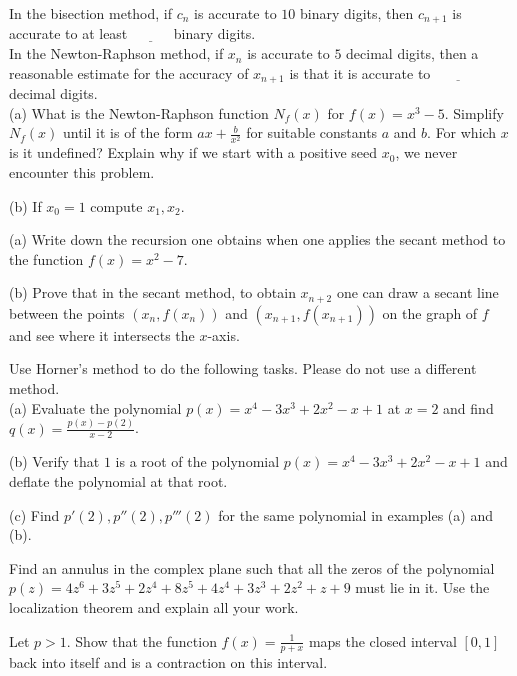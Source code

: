 \documentclass[12pt]{article}
\begin{document}
\newpage
{}
In the bisection method, if $c_n$ is accurate to $10$ binary digits, then $c_{n+1}$ is accurate to at least $\underline{~~~~~~~~~~~~}$ binary digits. \\
In the Newton-Raphson method, if $x_n$ is accurate to $5$ decimal digits, then a reasonable estimate for the accuracy of $x_{n+1}$ is that it is 
accurate to $\underline{~~~~~~~~~~~~~~~}$ decimal digits. \\ 

(a) What is the Newton-Raphson function $N_f(x)$ for $f(x)=x^3-5$. Simplify $N_f(x)$ until it is of the form 
$ax+\frac{b}{x^2}$ for suitable constants $a$ and $b$. For which $x$ is it undefined? Explain why if we start with a positive seed $x_0$, we never 
encounter this problem.

\vspace{2 in}

\noindent
(b) If $x_0=1$ compute $x_1, x_2$.

\newpage
{}
(a) Write down the recursion one obtains when one applies the secant method to the function $f(x)=x^2-7$. 

\vspace{2 in}

\noindent
(b) Prove that in the secant method, to obtain $x_{n+2}$ one can draw a secant line between the points $(x_n,f(x_n))$ and $(x_{n+1},f(x_{n+1}))$ on the 
graph of $f$ and see where it intersects the $x$-axis.

\newpage
{}
Use Horner's method to do the following tasks. Please do not use a different method. \\
(a) Evaluate the polynomial $p(x)=x^4-3x^3+2x^2-x+1$ at $x=2$ and find $q(x)=\frac{p(x)-p(2)}{x-2}$. 

\vspace{ 2 in}

\noindent
(b) Verify that $1$ is a root of the polynomial $p(x)=x^4-3x^3+2x^2-x+1$ and deflate the polynomial at that root. \\

\vspace{2 in}

\noindent
(c) Find $p'(2),p''(2), p'''(2)$ for the same polynomial in examples (a) and (b).

\newpage
{} Find an annulus in the complex plane such that all the zeros of the polynomial 
$p(z)=4z^6 + 3z^5 + 2z^4 + 8z^5 + 4z^4 + 3z^3+2z^2+z+9$ must lie in it. Use the localization theorem and explain all your work.


\newpage
{} Let $p > 1$. Show that the function $f(x)=\frac{1}{p+x}$ maps the closed interval $[0,1]$ back into itself and is a contraction on this interval.


\problemsdone
\end{document}
